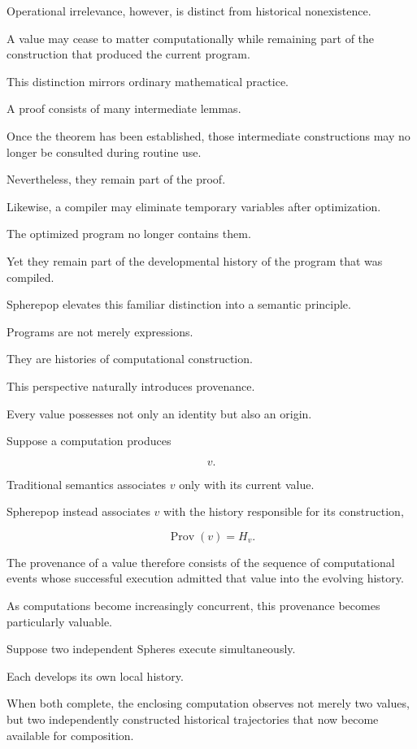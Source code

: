 \documentclass[12pt,oneside]{article}
\theoremstyle{definition}
\theoremstyle{remark}
\begin{document}
Operational irrelevance, however, is distinct from historical nonexistence.

A value may cease to matter computationally while remaining part of the
construction that produced the current program.

This distinction mirrors ordinary mathematical practice.

A proof consists of many intermediate lemmas.

Once the theorem has been established, those intermediate constructions may no
longer be consulted during routine use.

Nevertheless, they remain part of the proof.

Likewise, a compiler may eliminate temporary variables after optimization.

The optimized program no longer contains them.

Yet they remain part of the developmental history of the program that was
compiled.

Spherepop elevates this familiar distinction into a semantic principle.

Programs are not merely expressions.

They are histories of computational construction.

This perspective naturally introduces provenance.

Every value possesses not only an identity but also an origin.

Suppose a computation produces

\[
v.
\]

Traditional semantics associates \(v\) only with its current value.

Spherepop instead associates \(v\) with the history responsible for its
construction,

\[
\operatorname{Prov}(v)=H_v.
\]

The provenance of a value therefore consists of the sequence of computational
events whose successful execution admitted that value into the evolving
history.

As computations become increasingly concurrent, this provenance becomes
particularly valuable.

Suppose two independent Spheres execute simultaneously.

Each develops its own local history.

When both complete, the enclosing computation observes not merely two values,
but two independently constructed historical trajectories that now become
available for composition.
\end{document}
